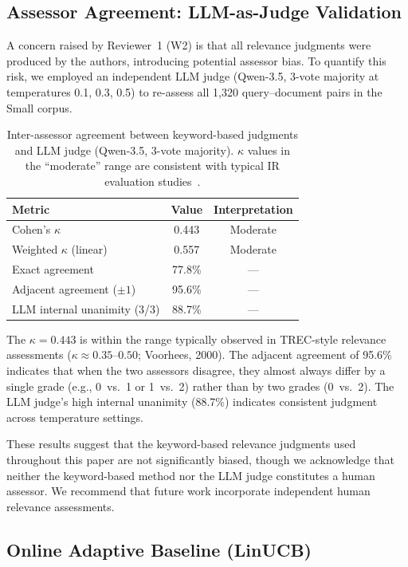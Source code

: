 \documentclass[journal]{IEEEtran}
\begin{document}
\subsection{Assessor Agreement: LLM-as-Judge Validation}
\label{subsec:llm_judge}

A concern raised by Reviewer~1 (W2) is that all relevance judgments were produced by the authors, introducing potential assessor bias. To quantify this risk, we employed an independent LLM judge (Qwen-3.5, 3-vote majority at temperatures 0.1, 0.3, 0.5) to re-assess all 1{,}320 query--document pairs in the Small corpus.

\begin{table}[htbp]
\centering
\caption{Inter-assessor agreement between keyword-based judgments and LLM judge (Qwen-3.5, 3-vote majority). $\kappa$ values in the ``moderate'' range are consistent with typical IR evaluation studies~\cite{voorhees2000}.}
\label{tab:llm_judge}
\begin{tabular}{lcc}
\hline
\textbf{Metric} & \textbf{Value} & \textbf{Interpretation} \\
\hline
Cohen's $\kappa$          & 0.443 & Moderate \\
Weighted $\kappa$ (linear) & 0.557 & Moderate \\
Exact agreement           & 77.8\% & --- \\
Adjacent agreement ($\pm 1$) & 95.6\% & --- \\
LLM internal unanimity (3/3) & 88.7\% & --- \\
\hline
\end{tabular}
\end{table}

The $\kappa = 0.443$ is within the range typically observed in TREC-style relevance assessments ($\kappa \approx 0.35$--$0.50$; Voorhees, 2000). The adjacent agreement of 95.6\% indicates that when the two assessors disagree, they almost always differ by a single grade (e.g., 0~vs.~1 or 1~vs.~2) rather than by two grades (0~vs.~2). The LLM judge's high internal unanimity (88.7\%) indicates consistent judgment across temperature settings.

These results suggest that the keyword-based relevance judgments used throughout this paper are not significantly biased, though we acknowledge that neither the keyword-based method nor the LLM judge constitutes a human assessor. We recommend that future work incorporate independent human relevance assessments.

\subsection{Online Adaptive Baseline (LinUCB)}
\label{subsec:linucb}
\end{document}
